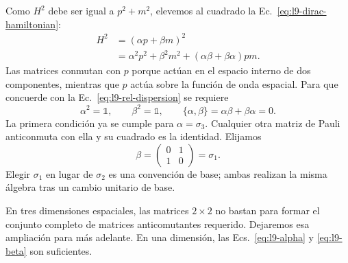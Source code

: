 Como \(H^2\) debe ser igual a \(p^2+m^2\), elevemos al cuadrado la Ec.~\eqref{eq:l9-dirac-hamiltonian}:
\begin{align}
H^2
&=(\alpha p+\beta m)^2\\
&=\alpha^2p^2+\beta^2m^2
+(\alpha\beta+\beta\alpha)pm.
\label{eq:l9-square-dirac}
\end{align}
Las matrices conmutan con \(p\) porque actúan en el espacio interno de dos componentes, mientras que \(p\) actúa sobre la función de onda espacial. Para que concuerde con la Ec.~\eqref{eq:l9-rel-dispersion} se requiere
\begin{equation}
\alpha^2=\mathbb{1},
\qquad
\beta^2=\mathbb{1},
\qquad
\{\alpha,\beta\}
=\alpha\beta+\beta\alpha=0.
\label{eq:l9-dirac-algebra}
\end{equation}
La primera condición ya se cumple para \(\alpha=\sigma_3\). Cualquier otra matriz de Pauli anticonmuta con ella y su cuadrado es la identidad. Elijamos
\begin{equation}
\beta=
\begin{pmatrix}
0&1\\
1&0
\end{pmatrix}
=\sigma_1.
\label{eq:l9-beta}
\end{equation}
Elegir \(\sigma_1\) en lugar de \(\sigma_2\) es una convención de base; ambas realizan la misma álgebra tras un cambio unitario de base.

\begin{classroomqa}
\end{classroomqa}

\begin{classroomqa}
\end{classroomqa}

En tres dimensiones espaciales, las matrices \(2\times2\) no bastan para formar el conjunto completo de matrices anticomutantes requerido. Dejaremos esa ampliación para más adelante. En una dimensión, las Ecs.~\eqref{eq:l9-alpha} y \eqref{eq:l9-beta} son suficientes.

